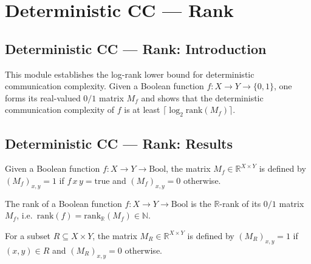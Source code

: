 \section{Deterministic CC --- Rank}
\subsection*{Deterministic CC --- Rank: Introduction}

This module establishes the log-rank lower bound for deterministic communication
complexity.  Given a Boolean function $f : X \to Y \to \{0,1\}$, one forms its
real-valued $0/1$ matrix $M_f$ and shows that the deterministic communication
complexity of $f$ is at least $\lceil \log_2 \mathrm{rank}(M_f) \rceil$.

\subsection*{Deterministic CC --- Rank: Results}

\begin{definition}
\label{CommunicationComplexity.Deterministic.Rank.boolFunctionMatrix}
\leanok
Given a Boolean function $f : X \to Y \to \mathrm{Bool}$, the matrix
$M_f \in \mathbb{R}^{X \times Y}$ is defined by $(M_f)_{x,y} = 1$ if
$f\,x\,y = \mathrm{true}$ and $(M_f)_{x,y} = 0$ otherwise.
\end{definition}

\begin{definition}
\label{CommunicationComplexity.Deterministic.Rank.boolFunctionRank}
\leanok
{}
The rank of a Boolean function $f : X \to Y \to \mathrm{Bool}$ is the
$\mathbb{R}$-rank of its $0/1$ matrix $M_f$, i.e.\
$\mathrm{rank}(f) = \mathrm{rank}_{\mathbb{R}}(M_f) \in \mathbb{N}$.
\end{definition}

\begin{definition}
\label{CommunicationComplexity.Deterministic.Rank.rectMatrix}
\leanok
For a subset $R \subseteq X \times Y$, the matrix $M_R \in \mathbb{R}^{X \times Y}$
is defined by $(M_R)_{x,y} = 1$ if $(x,y) \in R$ and $(M_R)_{x,y} = 0$ otherwise.
\end{definition}

